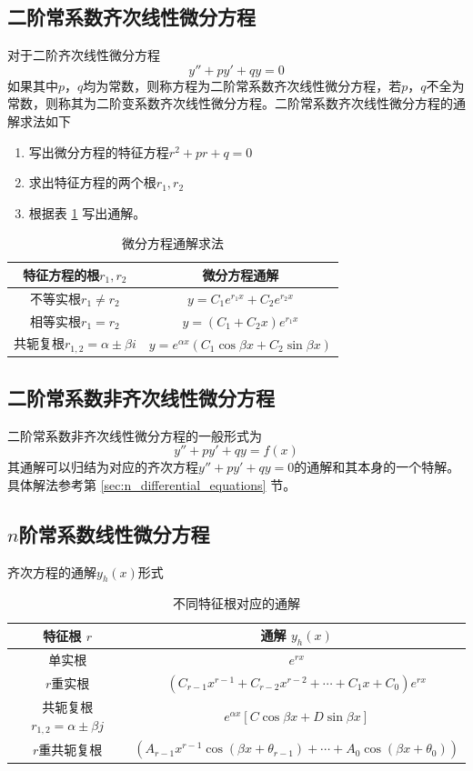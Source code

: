 \subsection{二阶常系数齐次线性微分方程}
对于二阶齐次线性微分方程
\[y''+py'+qy=0\]
如果其中$p$，$q$均为常数，则称方程为二阶常系数齐次线性微分方程，若$p$，$q$不全为常数，则称其为二阶变系数齐次线性微分方程。二阶常系数齐次线性微分方程的通解求法如下
\begin{enumerate}[nosep,leftmargin=0pt,labelindent=2em,itemindent=*]
    \item 写出微分方程的特征方程$r^2+pr+q=0$
    \item 求出特征方程的两个根$r_1, r_2$
    \item 根据表 \ref{tab:differential_equations} 写出通解。
\end{enumerate}
\begin{table}[htbp]
  \centering
  \caption{微分方程通解求法}
  \small
    \begin{tabular}{cc}
    \toprule
    特征方程的根$r_1,r_2$   & 微分方程通解 \\
    \midrule
   不等实根$r_1\ne r_2$ & $y=C_1e^{r_1x}+C_2e^{r_2x}$\\
   相等实根$r_1 = r_2$  & $y=\left(C_1+C_2 x\right)e^{r_1x}$\\
   共轭复根$r_{1,2} = \alpha \pm \beta i$ & $y=e^{\alpha x}\left(C_1\cos\beta x +C_2\sin \beta x\right)$\\
    \bottomrule
    \end{tabular}%
  \label{tab:differential_equations}%
\end{table}%
\subsection{二阶常系数非齐次线性微分方程}
二阶常系数非齐次线性微分方程的一般形式为
\[y''+py'+qy=f(x)\]
其通解可以归结为对应的齐次方程$y''+py'+qy=0$的通解和其本身的一个特解。具体解法参考第 \ref{sec:n_differential_equations} 节。
\subsection[高阶常系数线性微分方程]{$n$阶常系数线性微分方程}
齐次方程的通解$y_h(x)$形式
\label{sec:n_differential_equations}
\begin{table}[htbp]
  \centering
  \caption{不同特征根对应的通解}
   \small
    \begin{tabular}{cc}
    \toprule
    特征根 $r$   & 通解 $y_h(x)$  \\
    \midrule
    单实根 &  $e^{rx}$   \\
    $r$重实根 & $\left(C_{r-1}x^{r-1}+C_{r-2}x^{r-2}+\cdots+C_1x+C_0\right)e^{rx}$    \\
    共轭复根$r_{1,2}=\alpha\pm\beta j$ & $e^{\alpha x}[C\cos\beta x+D\sin \beta x]$\\
    $r$重共轭复根 & $\left(A_{r-1}x^{r-1}\cos(\beta x+\theta_{r-1})+\cdots+A_0\cos(\beta x+\theta_{0})\right)$    \\
    \bottomrule
    \end{tabular}%
\end{table}%

